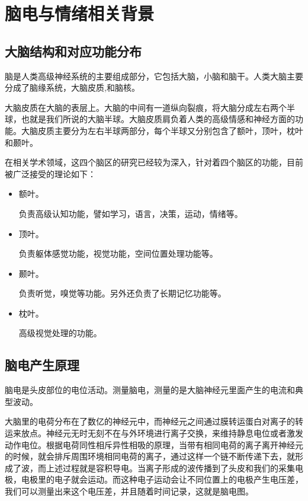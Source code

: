 
\chapter{脑电与情绪相关背景}
\label{chap:chap2x}

\section{大脑结构和对应功能分布}
	脑是人类高级神经系统的主要组成部分，它包括大脑，小脑和脑干。人类大脑主要分成了脑缘系统，大脑皮质,和脑核。
	
	大脑皮质在大脑的表层上。大脑的中间有一道纵向裂痕，将大脑分成左右两个半球，也就是我们所说的大脑半球。大脑皮质肩负着人类的高级情感和神经方面的功能。大脑皮质主要分为左右半球两部分，每个半球又分别包含了额叶，顶叶，枕叶和颞叶。
	
	在相关学术领域，这四个脑区的研究已经较为深入，针对着四个脑区的功能，目前被广泛接受的理论如下：
	\begin{itemize}
		\item 额叶。
		
			负责高级认知功能，譬如学习，语言，决策，运动，情绪等。
		\item 顶叶。
		
			负责躯体感觉功能，视觉功能，空间位置处理功能等。
		\item 颞叶。
			
			负责听觉，嗅觉等功能。另外还负责了长期记忆功能等。
		\item  枕叶。
		
			高级视觉处理的功能。
	\end{itemize}
	
\section{脑电产生原理}
	
	脑电是头皮部位的电位活动。测量脑电，测量的是大脑神经元里面产生的电流和典型波动。
	
	大脑里的电荷分布在了数亿的神经元中，而神经元之间通过膜转运蛋白对离子的转运来放点。神经元无时无刻不在与外环境进行离子交换，来维持静息电位或者激发动作电位。根据电荷同性相斥异性相吸的原理，当带有相同电荷的离子离开神经元的时候，就会排斥周围环境相同电荷的离子，通过这样一个链不断传递下去，就形成了波，而上述过程就是容积导电。当离子形成的波传播到了头皮和我们的采集电极，电极里的电子就会运动。而这种电子运动会让不同位置上的电极产生电压差，我们可以测量出来这个电压差，并且随着时间记录，这就是脑电图。
	
